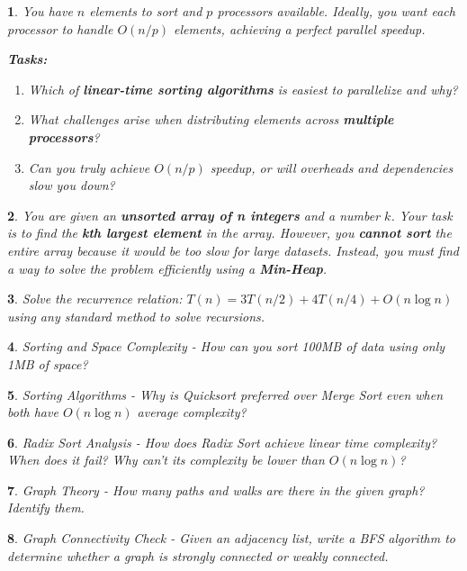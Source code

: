 \documentclass[%
addpoints]{exam}
\theoremstyle{problem}
\newtheorem{p}{}
\begin{document}
\begin{p}
You have \(n\) elements to sort and \(p\) processors available. Ideally, you want each processor to handle \(O(n/p)\) elements, achieving a perfect parallel speedup.

\textbf{Tasks:}
\begin{enumerate}
    \item Which of \textbf{linear-time sorting algorithms} is easiest to parallelize and why?
    \item What challenges arise when distributing elements across \textbf{multiple processors}?
    \item Can you truly achieve \(O(n/p)\) speedup, or will overheads and dependencies slow you down?
\end{enumerate}
\hfill\end{p}

\begin{p}
You are given an \textbf{unsorted array of n integers} and a number \(k\). Your task is to find the \textbf{kth largest element} in the array. However, you \textbf{cannot sort} the entire array because it would be too slow for large datasets. Instead, you must find a way to solve the problem efficiently using a \textbf{Min-Heap}.
\hfill\end{p}

\begin{p}
Solve the recurrence relation: \( T(n) = 3T(n/2) + 4T(n/4) + O(n \log n) \) using any standard method to solve recursions.
\hfill\end{p}

\begin{p}
Sorting and Space Complexity - How can you sort 100MB of data using only 1MB of space?
\hfill\end{p}

\begin{p}
Sorting Algorithms - Why is Quicksort preferred over Merge Sort even when both have \( O(n \log n) \) average complexity?
\hfill\end{p}

\begin{p}
Radix Sort Analysis - How does Radix Sort achieve linear time complexity? When does it fail? Why can't its complexity be lower than \( O(n \log n) \)?
\hfill\end{p}

\begin{p}
Graph Theory - How many paths and walks are there in the given graph? Identify them.
\begin{center}
\end{center}
\hfill\end{p}

\begin{p}
Graph Connectivity Check - Given an adjacency list, write a BFS algorithm to determine whether a graph is strongly connected or weakly connected.
\hfill\end{p}
\end{document}
